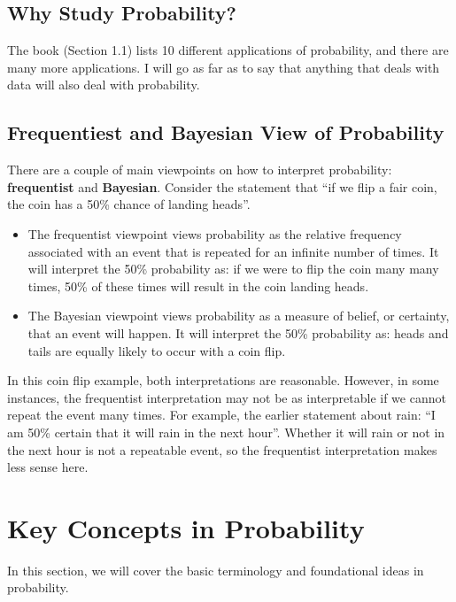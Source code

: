 \documentclass[
]{book}
\begin{document}
\subsection{Why Study Probability?}\label{why-study-probability}

The book (Section 1.1) lists 10 different applications of probability, and there are many more applications. I will go as far as to say that anything that deals with data will also deal with probability.

\subsection{Frequentiest and Bayesian View of Probability}\label{frequentiest-and-bayesian-view-of-probability}

There are a couple of main viewpoints on how to interpret probability: \textbf{frequentist} and \textbf{Bayesian}. Consider the statement that ``if we flip a fair coin, the coin has a 50\% chance of landing heads''.

\begin{itemize}
\item
  The frequentist viewpoint views probability as the relative frequency associated with an event that is repeated for an infinite number of times. It will interpret the 50\% probability as: if we were to flip the coin many many times, 50\% of these times will result in the coin landing heads.
\item
  The Bayesian viewpoint views probability as a measure of belief, or certainty, that an event will happen. It will interpret the 50\% probability as: heads and tails are equally likely to occur with a coin flip.
\end{itemize}

In this coin flip example, both interpretations are reasonable. However, in some instances, the frequentist interpretation may not be as interpretable if we cannot repeat the event many times. For example, the earlier statement about rain: ``I am 50\% certain that it will rain in the next hour''. Whether it will rain or not in the next hour is not a repeatable event, so the frequentist interpretation makes less sense here.

\section{Key Concepts in Probability}\label{key-concepts-in-probability}

In this section, we will cover the basic terminology and foundational ideas in probability.
\end{document}
